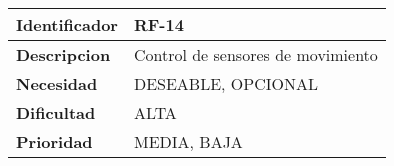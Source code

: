 \begin{center}
    \begin{tabular}{|p{2.6cm}|p{12cm}|}
    \hline
    \textbf{Identificador} & RF-14\\
    \hline
    \textbf{Descripcion} & Control de sensores de movimiento\\
    \hline
    \textbf{Necesidad} & DESEABLE, OPCIONAL\\
    \hline
    \textbf{Dificultad} & ALTA\\
    \hline
    \textbf{Prioridad} & MEDIA, BAJA\\
    \hline
    \end{tabular}
\end{center}
